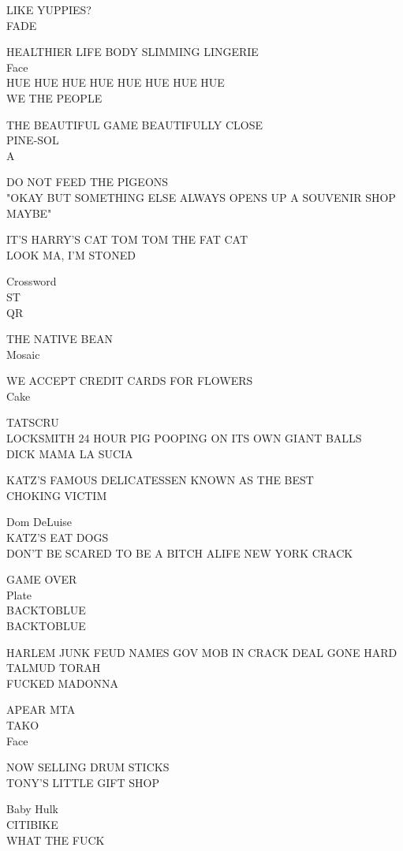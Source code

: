 \documentclass[10pt,letterpaper]{article}
\begin{document}
LIKE YUPPIES?\\
FADE

HEALTHIER LIFE BODY SLIMMING LINGERIE\\
Face\\
HUE HUE HUE HUE HUE HUE HUE HUE\\
WE THE PEOPLE

THE BEAUTIFUL GAME BEAUTIFULLY CLOSE\\
PINE{-}SOL\\
A

DO NOT FEED THE PIGEONS\\
"OKAY BUT SOMETHING ELSE ALWAYS OPENS UP A SOUVENIR SHOP MAYBE"

IT'S HARRY'S CAT TOM TOM THE FAT CAT\\
LOOK MA, I'M STONED

Crossword\\
ST\\
QR

THE NATIVE BEAN\\
Mosaic

WE ACCEPT CREDIT CARDS FOR FLOWERS\\
Cake

TATSCRU\\
LOCKSMITH 24 HOUR PIG POOPING ON ITS OWN GIANT BALLS\\
DICK MAMA LA SUCIA

KATZ'S FAMOUS DELICATESSEN KNOWN AS THE BEST\\
CHOKING VICTIM

Dom DeLuise\\
KATZ'S EAT DOGS\\
DON'T BE SCARED TO BE A BITCH ALIFE NEW YORK CRACK

GAME OVER\\
Plate\\
BACKTOBLUE\\
BACKTOBLUE

HARLEM JUNK FEUD NAMES GOV MOB IN CRACK DEAL GONE HARD\\
TALMUD TORAH\\
FUCKED MADONNA

APEAR MTA\\
TAKO\\
Face

NOW SELLING DRUM STICKS\\
TONY'S LITTLE GIFT SHOP

Baby Hulk\\
CITIBIKE\\
WHAT THE FUCK
\end{document}
